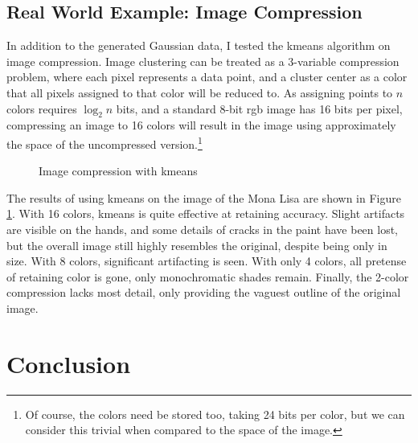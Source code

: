 \documentclass[a4paper]{article}
\begin{document}
\subsection{Real World Example: Image Compression} \label{realWorld}

In addition to the generated Gaussian data, I tested the kmeans algorithm on image compression. Image clustering can be treated as a 3-variable compression problem, where each pixel represents a data point, and a cluster center as a color that all pixels assigned to that color will be reduced to. As assigning points to $n$ colors requires $\log_2 n$ bits, and a standard 8-bit rgb image has 16 bits per pixel, compressing an image to 16 colors will result in the image using approximately  the space of the uncompressed version.\footnote{Of course, the colors need be stored too, taking 24 bits per color, but we can consider this trivial when compared to the space of the image.}

\begin{figure}[tbp]
  \centering
  \hfill
  \hfill
  \hfill
  \hfill
  \caption{Image compression with kmeans}
  \label{fig:images}
\end{figure}

The results of using kmeans on the image of the Mona Lisa are shown in Figure \ref{fig:images}. With 16 colors, kmeans is quite effective at retaining accuracy. Slight artifacts are visible on the hands, and some details of cracks in the paint have been lost, but the overall image still highly resembles the original, despite being only  in size. With 8 colors, significant artifacting is seen. With only 4 colors, all pretense of retaining color is gone, only monochromatic shades remain. Finally, the 2-color compression lacks most detail, only providing the vaguest outline of the original image.

\section{Conclusion}
\end{document}
